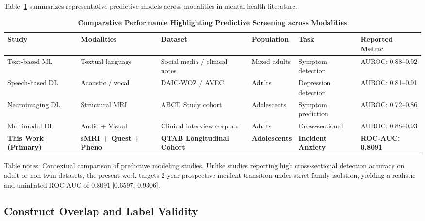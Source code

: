 \documentclass[10pt,letterpaper]{article}
\begin{document}
Table~\ref{tab:performanceearlyprediction} summarizes representative predictive models across modalities in mental health literature.

\begin{table}[!t]
\begin{adjustwidth}{-2.25in}{0in}
\centering
\caption{\textbf{Comparative Performance Highlighting Predictive Screening across Modalities}}
\label{tab:performanceearlyprediction}
\footnotesize
\renewcommand{\arraystretch}{1.15}
\begin{tabular}{|p{3.2cm}|p{2.6cm}|p{3.6cm}|p{2.2cm}|p{2.2cm}|p{2.2cm}|}
\hline
\textbf{Study} & \textbf{Modalities} & \textbf{Dataset} & \textbf{Population} & \textbf{Task} & \textbf{Reported Metric} \\
\hline
Text-based ML~\cite{ref11,ref17} & Textual language & Social media / clinical notes & Mixed adults & Symptom detection & AUROC: 0.88--0.92 \\
\hline
Speech-based DL~\cite{ref14,ref27} & Acoustic / vocal & DAIC-WOZ / AVEC & Adults & Depression detection & AUROC: 0.81--0.91 \\
\hline
Neuroimaging DL~\cite{ref46} & Structural MRI & ABCD Study cohort & Adolescents & Symptom prediction & AUROC: 0.72--0.86 \\
\hline
Multimodal DL~\cite{ref5,ref7,ref8} & Audio + Visual & Clinical interview corpora & Adults & Cross-sectional & AUROC: 0.88--0.93 \\
\hline
\textbf{This Work (Primary)} & \textbf{sMRI + Quest + Pheno} & \textbf{QTAB Longitudinal Cohort} & \textbf{Adolescents} & \textbf{Incident Anxiety} & \textbf{ROC-AUC: 0.8091} \\
\hline
\end{tabular}
\begin{flushleft}
Table notes: Contextual comparison of predictive modeling studies. Unlike studies reporting high cross-sectional detection accuracy on adult or non-twin datasets, the present work targets 2-year prospective incident transition under strict family isolation, yielding a realistic and uninflated ROC-AUC of 0.8091 [0.6597, 0.9306].
\end{flushleft}
\end{adjustwidth}
\end{table}

\subsection*{Construct Overlap and Label Validity}
\end{document}
